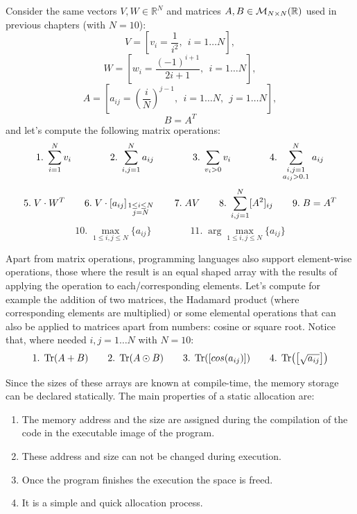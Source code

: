 Consider the same vectors $V, W \in \mathbb{R}^N$ and matrices $A, B \in { \cal{M}}_{N \times N} (\mathbb{R})$ used in previous chapters (with $N=10$): 
$$
V = \left[ v_i =\frac{1}{i^2}, \ \ i = 1 \ldots  N \right],
$$
$$
W = \left[ w_i = \frac{(-1)^{i+1}}{2i+1}, \ \ i = 1 \ldots  N \right],
$$
$$
A = \left[ a_{ij} = \left( \frac{i}{N} \right)^{j-1}, \ \ i = 1 \ldots  N, \ \ j = 1 \ldots  N \right],
$$
$$
B = A^T
$$
and let's compute the following matrix operations:
$$
1.\;\sum_{i=1}^N v_i  \qquad \qquad 2.\;\sum_{i,j=1}^N a_{ij}   \qquad \qquad   3.\;\sum_{v_i>0} v_i   \qquad \qquad 4.\;\sum_{\scriptstyle i,j=1 \atop \scriptstyle a_{ij} > 0.1}^N a_{ij}   
$$
$$
5.\; V\cdot W^T    \quad \quad      6.\; V\cdot [a_{ij}]_{\scriptstyle 1\leq i\leq N \atop \scriptstyle j = N}    \quad  \quad  7.\; AV     \quad \quad   8.\;\sum_{i,j=1}^N [A^2]_{ij}   \quad \quad    9.\; B = A^T
$$
$$
10.\;\max_{1\leq i,j\leq N} \{ a_{ij} \}       \qquad \qquad     11.\;\arg\max_{1\leq i,j\leq N} \{ a_{ij} \}   
$$

Apart from matrix operations, programming languages also support element-wise operations,
those where the result is an equal shaped array with the results of applying the operation to each/corresponding elements.
Let's compute for example the addition of two matrices, the Hadamard product (where corresponding elements are multiplied)
or some elemental operations that can also be applied to matrices apart from numbers: cosine or square root. 
Notice that, where needed $i,j = 1\ldots N$ with $N=10$:
$$
1.\;\Tr(A + B)  \quad \quad 2.\;\Tr(A\odot B)  \quad \quad   3.\;\Tr( \left[ cos( a_{ij} )\right] )   \quad \quad 4.\;\Tr( \left[ \sqrt{a_{ij}} \right] )
$$

Since the sizes of these arrays are known at compile-time, the memory storage can be declared statically. 
The main properties of a static allocation are:
\begin{enumerate}
    \item The memory address and the size are assigned during the compilation of the code in the executable image of the program.
    \item These address and size can not be changed during execution.
    \item Once the program finishes the execution the space is freed.
    \item It is a simple and quick allocation process.
\end{enumerate}



        \newpage
